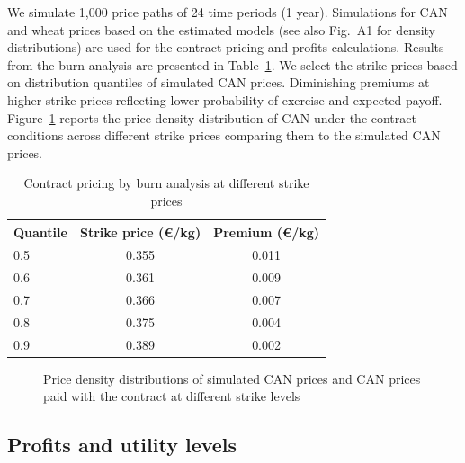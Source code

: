 \documentclass[12pt,a4paper]{article}
\begin{document}
We simulate 1,000 price paths of 24 time periods (1 year). Simulations for CAN and wheat prices based on the estimated models (see also Fig.~A1 for density distributions) are used for the contract pricing and profits calculations. Results from the burn analysis are presented in Table~\ref{tab:contract_pricing}. We select the strike prices based on distribution quantiles of simulated CAN prices. Diminishing premiums at higher strike prices reflecting lower probability of exercise and expected payoff. Figure~\ref{fig:density} reports the price density distribution of CAN under the contract conditions across different strike prices comparing them to the simulated CAN prices.

\begin{table}[H]
\centering
\caption{Contract pricing by burn analysis at different strike prices}
\label{tab:contract_pricing}
\begin{tabular}{lcc}
\toprule
Quantile & Strike price (\euro/kg) & Premium (\euro/kg) \\
\midrule
0.5 & 0.355 & 0.011 \\
0.6 & 0.361 & 0.009 \\
0.7 & 0.366 & 0.007 \\
0.8 & 0.375 & 0.004 \\
0.9 & 0.389 & 0.002 \\
\bottomrule
\end{tabular}
\end{table}

\begin{figure}[H]
\centering
\caption{Price density distributions of simulated CAN prices and CAN prices paid with the contract at different strike levels}
\label{fig:density}
\end{figure}

\subsection{Profits and utility levels}
\end{document}
